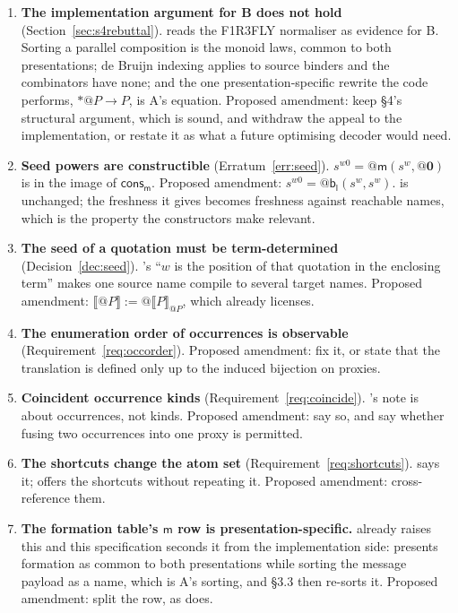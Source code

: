 \documentclass[11pt,a4paper]{article}
\makeatletter
\newcommand{\quo}[1]{@#1}
\newcommand{\drp}[1]{{*}#1}
\newcommand{\nil}{\mathbf{0}}
\newcommand{\enc}[1]{\llbracket #1 \rrbracket}
\newcommand{\mm}{\mathsf{m}}
\newcommand{\bl}{\mathsf{b}_{\mathsf{l}}}
\newcommand{\cons}{\mathsf{cons}}
\theoremstyle{definition}
\theoremstyle{plain}
\makeatother
\begin{document}
\begin{enumerate}[leftmargin=1.8em]

\item \textbf{The implementation argument for B does not hold}
(Section~\ref{sec:s4rebuttal}). \cite[\S4]{draft3} reads the F1R3FLY
normaliser as evidence for B. Sorting a parallel composition is the monoid
laws, common to both presentations; de Bruijn indexing applies to source
binders and the combinators have none; and the one presentation-specific
rewrite the code performs, $\drp{\quo{P}} \to P$, is A's equation. Proposed
amendment: keep \S4's structural argument, which is sound, and withdraw the
appeal to the implementation, or restate it as what a future optimising
decoder would need.

\item \textbf{Seed powers are constructible} (Erratum~\ref{err:seed}).
$s^{w0} = \quo{\mm(s^{w},\quo{\nil})}$ is in the image of $\cons_{\mm}$.
Proposed amendment: $s^{w0} = \quo{\bl(s^{w},s^{w})}$. \cite[Lem.~6.2]{draft3}
is unchanged; the freshness it gives becomes freshness against reachable
names, which is the property the constructors make relevant.

\item \textbf{The seed of a quotation must be term-determined}
(Decision~\ref{dec:seed}). \cite[Def.~6.6]{draft3}'s ``$w$ is the position of
that quotation in the enclosing term'' makes one source name compile to
several target names. Proposed amendment:
$\enc{\quo{P}} := \quo{\enc{P}_{\quo{P}}}$, which
\cite[Lem.~6.2]{draft3} already licenses.

\item \textbf{The enumeration order of occurrences is observable}
(Requirement~\ref{req:occorder}). Proposed amendment: fix it, or state that
the translation is defined only up to the induced bijection on proxies.

\item \textbf{Coincident occurrence kinds} (Requirement~\ref{req:coincide}).
\cite[Table~1]{draft3}'s note is about occurrences, not kinds. Proposed
amendment: say so, and say whether fusing two occurrences into one proxy is
permitted.

\item \textbf{The shortcuts change the atom set}
(Requirement~\ref{req:shortcuts}). \cite[Rem.~3.10]{draft3} says it;
\cite[Rem.~6.7]{draft3} offers the shortcuts without repeating it. Proposed
amendment: cross-reference them.

\item \textbf{The formation table's $\mm$ row is presentation-specific.}
\cite[Rem.~2.6]{logic} already raises this and this specification seconds it
from the implementation side: \cite[\S3.2]{draft3} presents formation as
common to both presentations while sorting the message payload as a name,
which is A's sorting, and \S3.3 then re-sorts it. Proposed amendment: split
the row, as \cite[Def.~2.3]{logic} does.


\end{enumerate}
\end{document}

